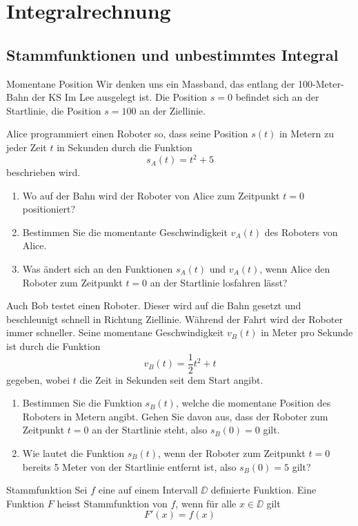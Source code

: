 \section{Integralrechnung}
\subsection{Stammfunktionen und unbestimmtes Integral}
\begin{LA}
	{Momentane Position}{}
	Wir denken uns ein Massband, das entlang der 100-Meter-Bahn der KS Im Lee ausgelegt ist. Die Position $s=0$ befindet sich an der Startlinie, die Position $s=100$ an der Ziellinie.

	Alice programmiert einen Roboter so, dass seine Position $s(t)$ in Metern zu jeder Zeit $t$ in Sekunden durch die Funktion
	$$s_A (t) = t^2 + 5$$
	beschrieben wird.

	\begin{enumerate}
		\item Wo auf der Bahn wird der Roboter von Alice zum Zeitpunkt $t=0$ positioniert?
		\item Bestimmen Sie die momentante Geschwindigkeit $v_A (t)$ des Roboters von Alice.
		\item Was ändert sich an den Funktionen $s_A (t)$ und $v_A (t)$, wenn Alice den Roboter zum Zeitpunkt $t=0$ an der Startlinie losfahren lässt?
	\end{enumerate}

	Auch Bob testet einen Roboter. Dieser wird auf die Bahn gesetzt und beschleunigt schnell in Richtung Ziellinie. Während der Fahrt wird der Roboter immer schneller. Seine momentane Geschwindigkeit $v_B(t)$ in Meter pro Sekunde ist durch die Funktion
	$$v_B(t) = \frac{1}{2} t^2 + t$$
	gegeben, wobei $t$ die Zeit in Sekunden seit dem Start angibt.

	\begin{enumerate}
		\item Bestimmen Sie die Funktion $s_B(t)$, welche die momentane Position des Roboters in Metern angibt. Gehen Sie davon aus, dass der Roboter zum Zeitpunkt $t=0$ an der Startlinie steht, also $s_B(0)=0$ gilt.
		\item Wie lautet die Funktion $s_B(t)$, wenn der Roboter zum Zeitpunkt $t=0$ bereits 5 Meter von der Startlinie entfernt ist, also $s_B(0)=5$ gilt?
	\end{enumerate}

\end{LA}


\clearpage
\begin{definition}
	{Stammfunktion}{}
	Sei $f$ eine auf einem Intervall $\DD$ definierte Funktion. Eine Funktion $F$ heisst Stammfunktion von $f$, wenn für alle $x \in \DD$ gilt
	$$F'(x) = f(x)$$

\end{definition}

